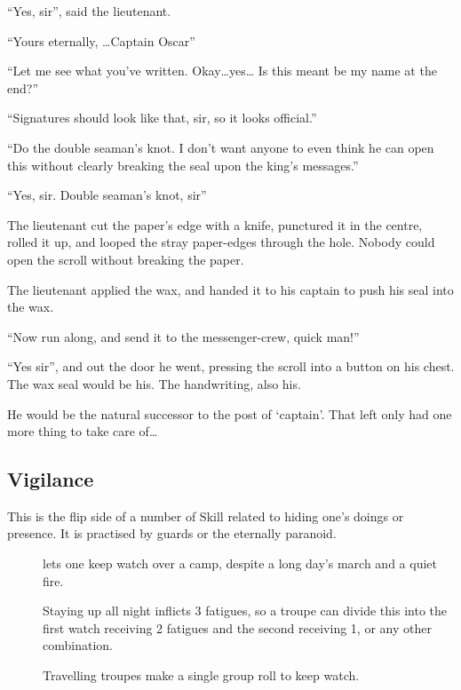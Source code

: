 \begin{multicols}{2}
\begin{exampletext}
  ``Yes, sir'', said the lieutenant.

  ``Yours eternally, \ldots Captain Oscar''

  ``Let me see what you've written.
  Okay\ldots yes\ldots
  Is this meant be my name at the end?''

  ``Signatures should look like that, sir, so it looks official.''

  ``Do the double seaman's knot.
  I don't want anyone to even think he can open this without clearly breaking the seal upon the king's messages.''

  ``Yes, sir.
  Double seaman's knot, sir''

  The lieutenant cut the paper's edge with a knife, punctured it in the centre, rolled it up, and looped the stray paper-edges through the hole.
  Nobody could open the scroll without breaking the paper.

  The lieutenant applied the wax, and handed it to his captain to push his seal into the wax.

  ``Now run along, and send it to the messenger-crew, quick man!''

  ``Yes sir'', and out the door he went, pressing the scroll into a button on his chest.
  The wax seal would be his.
  The handwriting, also his.

  He would be the natural successor to the post of `captain'.
  That left only had one more thing to take care of\ldots
  
\end{exampletext}

\subsection{Vigilance}

This is the flip side of a number of Skill related to hiding one's doings or presence.
It is practised by guards or the eternally paranoid.

\begin{description}
  \item[]
    lets one keep watch over a camp, despite a long day's march and a quiet fire.

    Staying up all night inflicts 3 \glspl{fatigue}, so a troupe can divide this into the first watch receiving 2 \glspl{fatigue} and the second receiving 1, or any other combination.

    Travelling troupes make a single group roll to keep watch.


\end{description}
\end{multicols}

